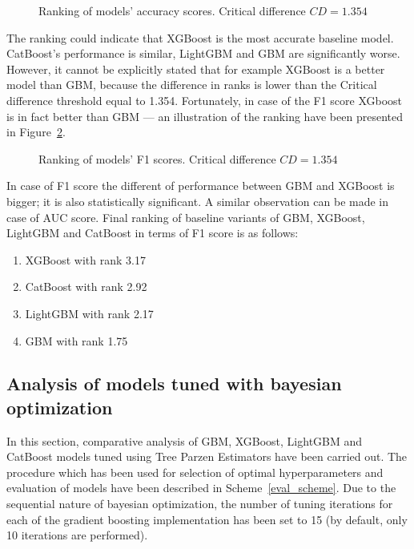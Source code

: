 \documentclass[magisterska, english]{pwr_wmat_praca_dyplomowa}
\theoremstyle{plain}
\numberwithin{theorem}{chapter}
\theoremstyle{definition}
\numberwithin{theorem}{chapter}
\newcommand{\gbm}{GBM, XGBoost, LightGBM and CatBoost }
\begin{document}
\begin{figure}[H]
	\centering
	\caption{Ranking of models' accuracy scores. Critical difference $CD = 1.354$}
	\label{fig:no_tuning_accuracy_heatmap}
\end{figure}

The ranking could indicate that XGBoost is the most accurate baseline model. CatBoost's performance is similar, LightGBM and GBM are significantly worse. However, it cannot be explicitly stated that for example XGBoost is a better model than GBM, because the difference in ranks is lower than the Critical difference threshold equal to 1.354. Fortunately, in case of the F1 score XGboost is in fact better than GBM --- an illustration of the ranking have been presented in Figure~\ref{fig:no_tuning_F1_heatmap}.

\begin{figure}[H]
	\centering
	\caption{Ranking of models' F1 scores. Critical difference $CD = 1.354$}
	\label{fig:no_tuning_F1_heatmap}
\end{figure}

In case of F1 score the different of performance between GBM and XGBoost is bigger; it is also statistically significant. A similar observation can be made in case of AUC score. Final ranking of baseline variants of \gbm in terms of F1 score is as follows:

\begin{enumerate}
    \item XGBoost with rank 3.17
    \item CatBoost with rank 2.92
    \item LightGBM with rank 2.17
    \item GBM with rank 1.75
\end{enumerate}

\subsection{Analysis of models tuned with bayesian optimization}\label{section_tpe}
In this section, comparative analysis of \gbm models tuned using Tree Parzen Estimators have been carried out. The procedure which has been used for selection of optimal hyperparameters and evaluation of models have been described in Scheme~\ref{eval_scheme}. Due to the sequential nature of bayesian optimization, the number of tuning iterations for each of the gradient boosting implementation has been set to 15 (by default, only 10 iterations are performed). 
\end{document}
